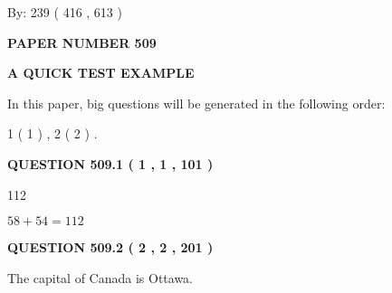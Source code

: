\documentclass[12pt]{article}
\begin{document}
   
\hspace{1.0in} By: 
 239 ( 416 ,  613 )
   
   
   
   
\newpage 
\setcounter{page}{ 
   509001 } 
   
   
   
   
 {\textbf{ \Large{ PAPER NUMBER  509  }}}
   
   
\vspace{0.2in}
   
   
   
   
   
   
 \vspace{0.2in}
{\LARGE {\textbf{ A QUICK TEST EXAMPLE}}}
   
   
   
\vspace{0.2in}
   
In this paper, big questions will be generated in the following order: 
   
   
   1 ( 1 )
 ,
   2 ( 2 )
 .
  
\vspace{0.2in}
  
{\textbf{\Large{QUESTION
509.1 
 ( 1 , 1 , 101 )
}}}
  
  
 
 
\noindent{}

112
 
 
 
 
\noindent{}

$ %
58 +  %
54=   %
112$
 
 
  
\vspace{0.2in}
  
{\textbf{\Large{QUESTION
509.2 
 ( 2 , 2 , 201 )
}}}
  
  
 
 
\noindent{}
 
 
The capital of Canada is Ottawa.
 
 
 
 
   
   
 \vspace{0.2in}
 
\end{document}
